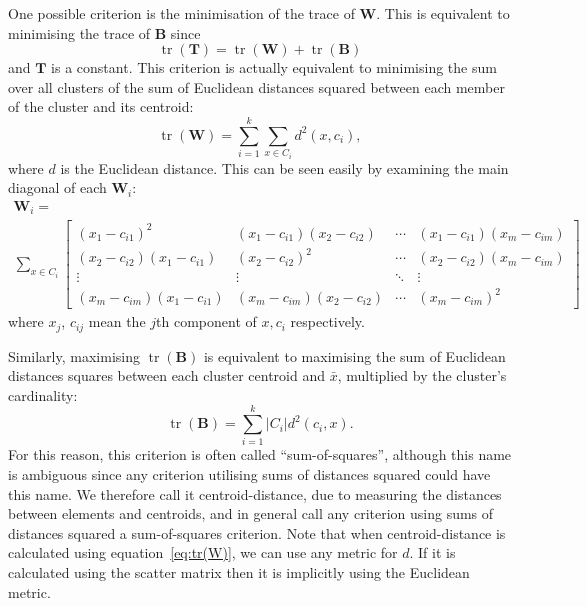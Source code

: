 \documentclass[a4paper]{report}
\DeclareMathOperator*{\tr}{tr}
\begin{document}
One possible criterion is the minimisation of the trace of $\mathbf{W}$.  This
is equivalent to minimising the trace of $\mathbf{B}$ since
\begin{equation*}
  \tr(\mathbf{T}) = \tr(\mathbf{W}) + \tr(\mathbf{B})
\end{equation*}
and $\mathbf{T}$ is a constant.  This criterion is actually equivalent to
minimising the sum over all clusters of the sum of Euclidean distances squared
between each member of the cluster and its centroid:
\begin{equation}
  \label{eq:tr(W)}
  \tr(\mathbf{W}) = \sum_{i=1}^{k} \sum_{x \in C_i} d^2(x,c_i),
\end{equation}
where $d$ is the Euclidean distance.  This can be seen easily by examining the
main diagonal of each $\mathbf{W}_i$:
\begin{multline*}
  \mathbf{W}_i = \\
  \sum_{x \in C_i}
  \begin{bmatrix}
    (x_1-c_{i1})^2 & (x_1-c_{i1})(x_2-c_{i2}) & \cdots &
    (x_1-c_{i1})(x_m-c_{im}) \\
    (x_2-c_{i2})(x_1-c_{i1}) & (x_2-c_{i2})^2 & \cdots &
    (x_2-c_{i2})(x_m-c_{im}) \\
    \vdots & \vdots & \ddots & \vdots \\
    (x_m-c_{im})(x_1-c_{i1}) & (x_m-c_{im})(x_2-c_{i2}) & \cdots &
    (x_m-c_{im})^2
  \end{bmatrix}
\end{multline*}
where $x_j$, $c_{ij}$ mean the $j$th component of $x,c_{i}$ respectively.

Similarly, maximising $\tr(\mathbf{B})$ is equivalent to maximising the sum of
Euclidean distances squares between each cluster centroid and $\bar{x}$,
multiplied by the cluster's cardinality:
\begin{equation}
  \label{eq:tr(B)}
  \tr(\mathbf{B}) = \sum_{i=1}^{k} |C_i| d^2(c_i,x).
\end{equation}
For this reason, this criterion is often called ``sum-of-squares'', although
this name is ambiguous since any criterion utilising sums of distances squared
could have this name.  We therefore call it centroid-distance, due to
measuring the distances between elements and centroids, and in general call
any criterion using sums of distances squared a sum-of-squares criterion.
Note that when centroid-distance is calculated using
equation~\eqref{eq:tr(W)}, we can use any metric for $d$.  If it is calculated
using the scatter matrix then it is implicitly using the Euclidean metric.
\end{document}

